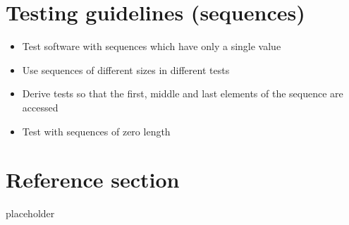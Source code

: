 \documentclass{article}
\begin{document}
\section{Testing guidelines (sequences)}

\begin{itemize}
  \item Test software with sequences which have only a single value
  \item Use sequences of different sizes in different tests
  \item Derive tests so that the first, middle and last elements of the sequence are accessed
  \item Test with sequences of zero length
\end{itemize}


\pagebreak
\section*{Reference section} \label{sec:reference}
\begin{description}
	\item[placeholder] \hfill \\
\end{description}
\end{document}
